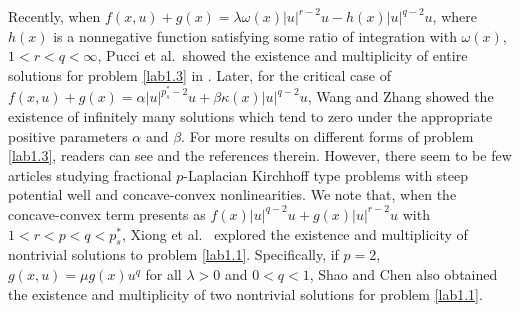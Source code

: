 \documentclass[reqno]{amsart}
\begin{document}
Recently, when $f(x,u)+g(x)=\lambda\omega(x)|u|^{r-2}u-h(x)|u|^{q-2}u$, where 
$h(x)$ is a nonnegative function satisfying some ratio of integration with
$\omega(x)$, $1 < r < q <\infty$, Pucci et al.\ showed the existence and multiplicity 
of entire solutions for problem \eqref{lab1.3} in \cite{r20}. 
Later, for the critical case of $f(x,u)+g(x)=\alpha|u|^{p^*_s-2}u+\beta 
\kappa(x)|u|^{q-2}u$, Wang and Zhang  \cite{r28} showed the existence of infinitely 
many solutions which tend to zero under the appropriate positive parameters $\alpha$ 
and $\beta$. For more results on different forms of problem \eqref{lab1.3}, readers 
can see  \cite{r9, r17, r25, r32, r35} and the references therein. However, 
there seem to be few articles studying fractional $p$-Laplacian Kirchhoff type problems 
with steep potential well and concave-convex nonlinearities. We note that, when the 
concave-convex term presents as $f(x)|u|^{q-2}u+g(x)|u|^{r-2}u$ with $1<r<p<q<p^*_s$, 
Xiong et al.\  \cite{r33} explored the existence and multiplicity of nontrivial 
solutions to problem \eqref{lab1.1}. Specifically, if $p=2$, $g(x,u)=\mu g(x)u^q$ for all 
$\lambda>0$ and $0<q<1$, Shao and Chen \cite{r21} also obtained the existence and 
multiplicity of two nontrivial solutions for problem \eqref{lab1.1}.
\end{document}
